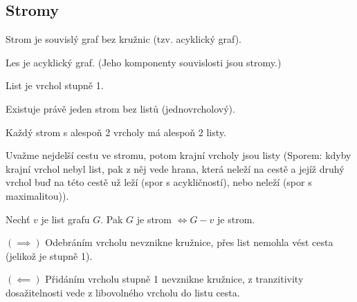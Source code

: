 \documentclass[12pt]{article}					%
\begin{document}
    \subsection{Stromy}
        \begin{definice}[Strom]
            Strom je souvislý graf bez kružnic (tzv. acyklický graf).
        \end{definice}

        \begin{definice}[Les]
            Les je acyklický graf. (Jeho komponenty souvislosti jsou stromy.)
        \end{definice}

        \begin{definice}[List]
            List je vrchol stupně 1.
        \end{definice}

        \begin{upozorneni}
            Existuje právě jeden strom bez listů (jednovrcholový).
        \end{upozorneni}

        \begin{lemma}
            Každý strom s alespoň 2 vrcholy má alespoň 2 listy.
            \begin{dukazin}
                Uvažme nejdelší cestu ve stromu, potom krajní vrcholy jsou listy (Sporem: kdyby krajní vrchol nebyl list, pak z něj vede hrana, která neleží na cestě a jejíž druhý vrchol buď na této cestě už leží (spor s acykličností), nebo neleží (spor s maximalitou)).
            \end{dukazin}
        \end{lemma}

        \begin{lemma}
            Nechť $v$ je list grafu $G$. Pak $G$ je strom $\Leftrightarrow G - v$ je strom.
            \begin{dukazin}
                $(\implies)$ Odebráním vrcholu nevznikne kružnice, přes list nemohla vést cesta (jelikož je stupně 1).

                $(\impliedby)$ Přidáním vrcholu stupně 1 nevznikne kružnice, z tranzitivity dosažitelnosti vede z libovolného vrcholu do listu cesta.
            \end{dukazin}
        \end{lemma}

\end{document}
